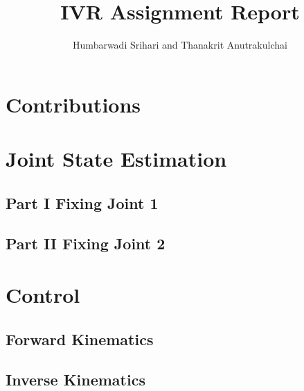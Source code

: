 \documentclass[11pt, a4paper]{article}
\title{IVR Assignment Report}
\author{Humbarwadi Srihari and Thanakrit Anutrakulchai}
\begin{document}
    \maketitle
    \section{Contributions}
    \section{Joint State Estimation}
    \subsection{Part I \textemdash Fixing Joint 1}
    \subsection{Part II \textemdash Fixing Joint 2}
    \section{Control}
    \subsection{Forward Kinematics}
    \subsection{Inverse Kinematics}
\end{document}
